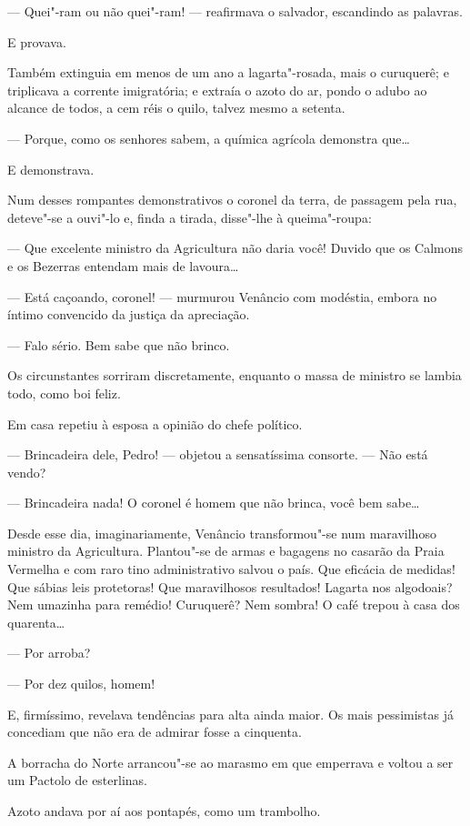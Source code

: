 --- Quei"-ram ou não quei"-ram! --- reafirmava o salvador, escandindo as
palavras.

E provava.

Também extinguia em menos de um ano a lagarta"-rosada, mais o curuquerê;
e triplicava a corrente imigratória; e extraía o azoto do ar, pondo o
adubo ao alcance de todos, a cem réis o quilo, talvez mesmo a setenta.

--- Porque, como os senhores sabem, a química agrícola demonstra que\ldots{}

E demonstrava.

Num desses rompantes demonstrativos o coronel da terra, de passagem pela
rua, deteve"-se a ouvi"-lo e, finda a tirada, disse"-lhe à queima"-roupa:

--- Que excelente ministro da Agricultura não daria você! Duvido que os
Calmons e os Bezerras entendam mais de lavoura\ldots{}

--- Está caçoando, coronel! --- murmurou Venâncio com modéstia, embora
no íntimo convencido da justiça da apreciação.

--- Falo sério. Bem sabe que não brinco.

Os circunstantes sorriram discretamente, enquanto o massa de ministro se
lambia todo, como boi feliz.

Em casa repetiu à esposa a opinião do chefe político.

--- Brincadeira dele, Pedro! --- objetou a sensatíssima consorte. ---
Não está vendo?

--- Brincadeira nada! O coronel é homem que não brinca, você bem sabe\ldots{}

Desde esse dia, imaginariamente, Venâncio transformou"-se num maravilhoso
ministro da Agricultura. Plantou"-se de armas e bagagens no casarão da
Praia Vermelha e com raro tino administrativo salvou o país. Que
eficácia de medidas! Que sábias leis protetoras! Que maravilhosos
resultados! Lagarta nos algodoais? Nem umazinha para remédio! Curuquerê?
Nem sombra! O café trepou à casa dos quarenta\ldots{}

--- Por arroba?

--- Por dez quilos, homem!

E, firmíssimo, revelava tendências para alta ainda maior. Os mais
pessimistas já concediam que não era de admirar fosse a cinquenta.

A borracha do Norte arrancou"-se ao marasmo em que emperrava e voltou a
ser um Pactolo de esterlinas.

Azoto andava por aí aos pontapés, como um trambolho.

